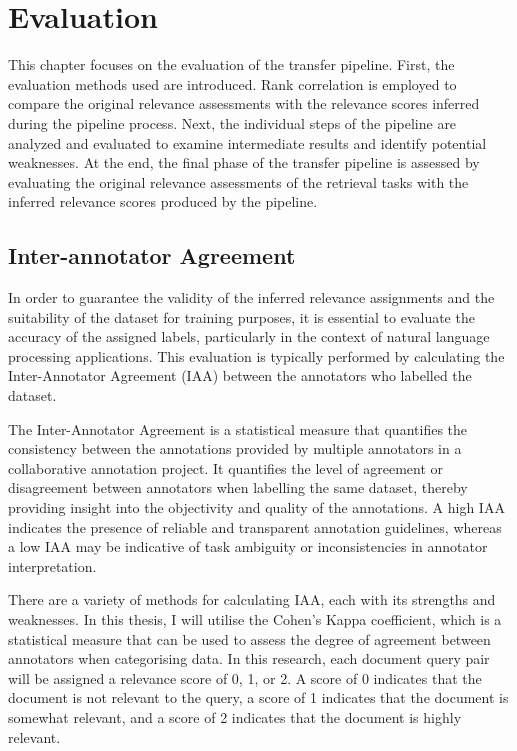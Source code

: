 \chapter{Evaluation}\label{evaluation}

This chapter focuses on the evaluation of the transfer pipeline. First, the evaluation methods used are introduced. Rank correlation is employed to compare the original relevance assessments with the relevance scores inferred during the pipeline process. Next, the individual steps of the pipeline are analyzed and evaluated to examine intermediate results and identify potential weaknesses. At the end, the final phase of the transfer pipeline is assessed by evaluating the original relevance assessments of the retrieval tasks with the inferred relevance scores produced by the pipeline.

\section{Inter-annotator Agreement}\label{inter-annotator-agreement}

In order to guarantee the validity of the inferred relevance assignments and the suitability of the dataset for training purposes, it is essential to evaluate the accuracy of the assigned labels, particularly in the context of natural language processing applications. This evaluation is typically performed by calculating the Inter-Annotator Agreement (IAA) between the annotators who labelled the dataset.

The Inter-Annotator Agreement is a statistical measure that quantifies the consistency between the annotations provided by multiple annotators in a collaborative annotation project. It quantifies the level of agreement or disagreement between annotators when labelling the same dataset, thereby providing insight into the objectivity and quality of the annotations. A high IAA indicates the presence of reliable and transparent annotation guidelines, whereas a low IAA may be indicative of task ambiguity or inconsistencies in annotator interpretation.

There are a variety of methods for calculating IAA, each with its strengths and weaknesses. In this thesis, I will utilise the Cohen's Kappa coefficient, which is a statistical measure that can be used to assess the degree of agreement between annotators when categorising data. In this research, each document query pair will be assigned a relevance score of 0, 1, or 2. A score of 0 indicates that the document is not relevant to the query, a score of 1 indicates that the document is somewhat relevant, and a score of 2 indicates that the document is highly relevant.

